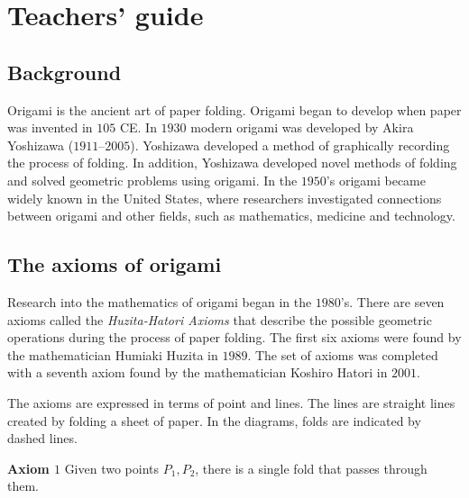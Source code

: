 
\section{Teachers' guide}

\subsection{Background}

Origami is the ancient art of paper folding. Origami began to develop when paper was invented in $105$ CE. In $1930$ modern origami was developed by Akira Yoshizawa ($1911$--$2005$). Yoshizawa developed a method of graphically recording the process of folding. In addition, Yoshizawa developed novel methods of folding and solved geometric problems using origami. In the $1950$'s origami became widely known in the United States, where researchers investigated connections between origami and other fields, such as mathematics, medicine and technology.

\subsection{The axioms of origami}

Research into the mathematics of origami began in the $1980$'s. There are seven axioms called the \emph{Huzita-Hatori Axioms} that describe the possible geometric operations during the process of paper folding. The first six axioms were found by the mathematician Humiaki Huzita in $1989$. The set of axioms was completed with a seventh axiom found by the mathematician Koshiro Hatori in $2001$. 

The axioms are expressed in terms of point and lines. The lines are straight lines created by folding a sheet of paper. In the diagrams, folds are indicated by dashed lines.

\textbf{Axiom $1$} Given two points $P_1,P_2$, there is a single fold that passes through them.
\begin{center}
\vspace{-1ex}
\end{center}

